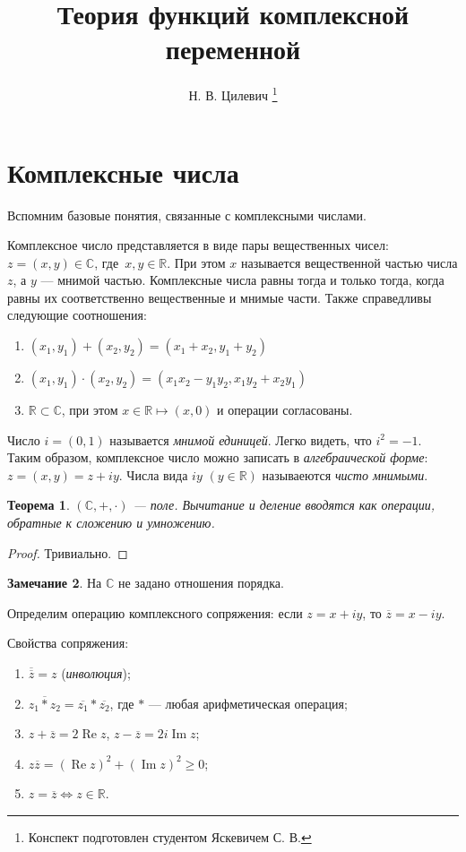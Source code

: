 \documentclass[11pt,openany,a4paper]{scrartcl}
\author{Н. В. Цилевич \thanks{Конспект подготовлен студентом Яскевичем С. В.}}
\title{Теория функций комплексной переменной}
\theoremstyle{plain}
\newtheorem{theorem}{Теорема}[section]
\theoremstyle{definition}
\newtheorem{remark}[theorem]{Замечание}
\newcommand\mb{\mathbb}
\newcommand\real{\mb R}
\newcommand{\complex}{\mb C}
\DeclareMathOperator{\Ree}{Re}
\DeclareMathOperator{\Img}{Im}
\begin{document}
\maketitle

\tableofcontents

\pagebreak

\section{Комплексные числа}

Вспомним базовые понятия, связанные с комплексными числами.

Комплексное число представляется в виде пары вещественных чисел: $ z = (x, y) \in \complex$,
где~$ x,y \in \real$. При этом $x$ называется вещественной частью числа $z$, а $y$ — мнимой частью. Комплексные
числа равны тогда и только тогда, когда равны их соответственно вещественные и мнимые части. Также справедливы
следующие соотношения:
\begin{enumerate}
	\item $(x_1, y_1) + (x_2, y_2) = (x_1 + x_2, y_1 + y_2)$
	\item $(x_1, y_1) \cdot (x_2, y_2) = (x_1x_2 - y_1y_2, x_1y_2 + x_2y_1)$
	\item $\real \subset \complex$, при этом $x \in \real \mapsto (x, 0)$ и операции согласованы.
\end{enumerate}

Число $i = (0, 1)$ называется \emph{мнимой единицей}. Легко видеть, что $i^2 = -1$. Таким образом, комплексное
число можно записать в \emph{алгебраической форме}: $z = (x, y) = z + iy$. Числа вида $iy$ $(y \in \real)$
называеются \emph{чисто мнимыми}.

\begin{theorem}
	$(\complex, +, \cdot)$ — поле. Вычитание и деление вводятся как операции, обратные к сложению и умножению.
\end{theorem}
\begin{proof}
	Тривиально.
\end{proof}
\begin{remark}
	На $\complex$ не задано отношения порядка.
\end{remark}

Определим операцию комплексного сопряжения: если $z = x + iy$, то $\overline z = x - iy$.

Свойства сопряжения:
\begin{enumerate}
	\item $\overline{\overline z} = z$ (\emph{инволюция});
	\item $\overline{z_1 \ast z_2} = \overline{z_1} \ast \overline{z_2}$, где $\ast$ — любая арифметическая операция;
	\item $z + \overline z = 2\Ree z$, $z - \overline z = 2i\Img z$;
	\item $z\overline z = (\Ree z)^2 + (\Img z)^2 \geqslant 0$;
	\item $z = \overline z \iff z \in \real$.
\end{enumerate}
\end{document}
